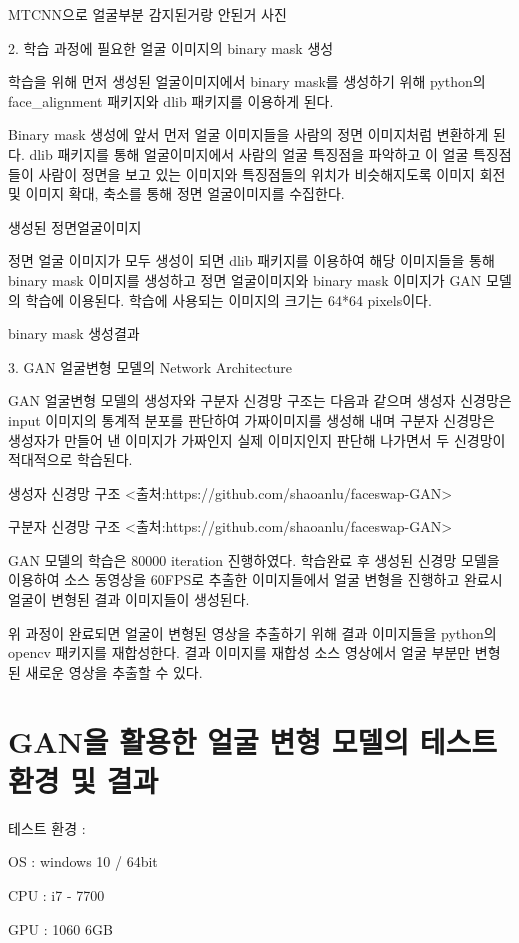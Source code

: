 \documentclass{oblivoir}
\begin{document}
MTCNN으로 얼굴부분 감지된거랑 안된거 사진

2. 학습 과정에 필요한 얼굴 이미지의 binary mask 생성

학습을 위해 먼저 생성된 얼굴이미지에서 binary mask를 생성하기 위해 python의 face_alignment 패키지와 dlib 패키지를 이용하게 된다.

Binary mask 생성에 앞서 먼저 얼굴 이미지들을 사람의 정면 이미지처럼 변환하게 된다. dlib 패키지를 통해 얼굴이미지에서 사람의 얼굴 특징점을 파악하고 이 얼굴 특징점들이 사람이 정면을 보고 있는 이미지와 특징점들의 위치가 비슷해지도록 이미지 회전 및 이미지 확대, 축소를 통해 정면 얼굴이미지를 수집한다.

생성된 정면얼굴이미지

정면 얼굴 이미지가 모두 생성이 되면 dlib 패키지를 이용하여 해당 이미지들을 통해 binary mask 이미지를 생성하고 정면 얼굴이미지와 binary mask 이미지가 GAN 모델의 학습에 이용된다. 학습에 사용되는 이미지의 크기는 64*64 pixels이다. 

binary mask 생성결과

3. GAN 얼굴변형 모델의 Network Architecture

GAN 얼굴변형 모델의 생성자와 구분자 신경망 구조는 다음과 같으며 생성자 신경망은 input 이미지의 통계적 분포를 판단하여 가짜이미지를 생성해 내며 구분자 신경망은 생성자가 만들어 낸 이미지가 가짜인지 실제 이미지인지 판단해 나가면서 두 신경망이 적대적으로 학습된다.

생성자 신경망 구조 <출처:https://github.com/shaoanlu/faceswap-GAN>

구분자 신경망 구조 <출처:https://github.com/shaoanlu/faceswap-GAN>

GAN 모델의 학습은 80000 iteration 진행하였다. 학습완료 후 생성된 신경망 모델을 이용하여 소스 동영상을 60FPS로 추출한 이미지들에서 얼굴 변형을 진행하고 완료시 얼굴이 변형된 결과 이미지들이 생성된다.

위 과정이 완료되면 얼굴이 변형된 영상을 추출하기 위해 결과 이미지들을 python의 opencv 패키지를 재합성한다. 결과 이미지를 재합성 소스 영상에서 얼굴 부분만 변형된 새로운 영상을 추출할 수 있다.

\section{ GAN을 활용한 얼굴 변형 모델의 테스트 환경 및 결과}

테스트 환경 :

OS : windows 10 / 64bit

CPU : i7 - 7700

GPU : 1060 6GB
\end{document}
